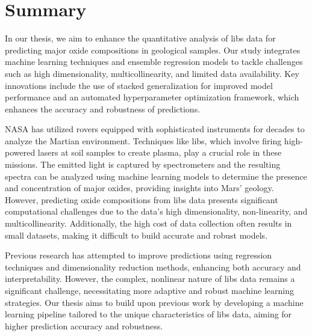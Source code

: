 \section*{Summary}
In our thesis, we aim to enhance the quantitative analysis of \gls{libs} data for predicting major oxide compositions in geological samples.
Our study integrates machine learning techniques and ensemble regression models to tackle challenges such as high dimensionality, multicollinearity, and limited data availability.
Key innovations include the use of stacked generalization for improved model performance and an automated hyperparameter optimization framework, which enhances the accuracy and robustness of predictions.

\vspace{0.5em}

NASA has utilized rovers equipped with sophisticated instruments for decades to analyze the Martian environment.
Techniques like \gls{libs}, which involve firing high-powered lasers at soil samples to create plasma, play a crucial role in these missions.
The emitted light is captured by spectrometers and the resulting spectra can be analyzed using machine learning models to determine the presence and concentration of major oxides, providing insights into Mars' geology.
However, predicting oxide compositions from \gls{libs} data presents significant computational challenges due to the data's high dimensionality, non-linearity, and multicollinearity.
Additionally, the high cost of data collection often results in small datasets, making it difficult to build accurate and robust models.

\vspace{0.5em}

Previous research has attempted to improve predictions using regression techniques and dimensionality reduction methods, enhancing both accuracy and interpretability.
However, the complex, nonlinear nature of \gls{libs} data remains a significant challenge, necessitating more adaptive and robust machine learning strategies.
Our thesis aims to build upon previous work by developing a machine learning pipeline tailored to the unique characteristics of \gls{libs} data, aiming for higher prediction accuracy and robustness.

\vspace{0.5em}

